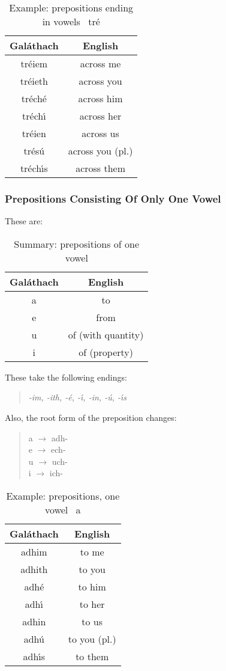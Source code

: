 \begin{table}[H]
\centering
\begin{tabu}{c|c}
  \textbf{Gal\'{a}thach} & \textbf{English}\\
  \toprule
  tr\'{e}iem & across me\\
  tr\'{e}ieth & across you\\
  tr\'{e}ch\'{e} & across him\\
  tr\'{e}ch\'{\i} & across her\\
  tr\'{e}ien & across us\\
  tr\'{e}s\'{u} & across you (pl.)\\
  tr\'{e}ch\'{\i}s & across them
\end{tabu}
\caption{Example: prepositions ending in vowels \textendash\ tr\'{e}}
\label{example_prepositions_ending_in_vowels_tre}
\end{table}

\subsubsection{Prepositions Consisting Of Only One Vowel}

These are:
\begin{table}[H]
\centering
\begin{tabu}{c|c}
  \textbf{Gal\'{a}thach} & \textbf{English}\\
  \toprule
  a & to\\
  e & from\\
  u & of (with quantity)\\
  i & of (property)
\end{tabu}
\caption{Summary: prepositions of one vowel}
\label{summary_prepositions_of_one_vowel}
\end{table}

These take the following endings:
\begin{quote}
\textit{-im, -ith, -\'{e}, -\'{\i}, -in, -\'{u}, -\'{\i}s}
\end{quote}

Also, the root form of the preposition changes:
\begin{quote}
a $\rightarrow$ adh-\\
e $\rightarrow$ ech-\\
u $\rightarrow$ uch-\\
i $\rightarrow$ ich-
\end{quote}

\begin{table}[H]
\centering
\begin{tabu}{c|c}
  \textbf{Gal\'{a}thach} & \textbf{English}\\
  \toprule
  adhim & to me\\
  adhith & to you\\
  adh\'{e} & to him\\
  adh\'{\i} & to her\\
  adhin & to us\\
  adh\'{u} & to you (pl.)\\
  adh\'{\i}s & to them
\end{tabu}
\caption{Example: prepositions, one vowel \textendash\ a}
\label{example_prepositions_one_vowel_a}
\end{table}

